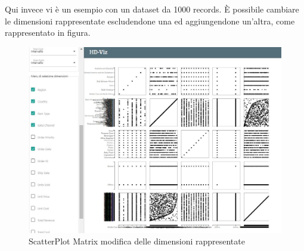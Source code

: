 \documentclass[../manuale_utente.tex]{subfiles}
\begin{document}
Qui invece vi è un esempio con un dataset da 1000 records. È possibile cambiare le dimensioni rappresentate escludendone una ed aggiungendone un'altra, come rappresentato in figura.

\begin{figure}[H]
	\centering
	\includegraphics[width=18cm]{img/spm/spm_cambio_dim.jpg}
	\caption{ScatterPlot Matrix modifica delle dimensioni rappresentate}
\end{figure}
\end{document}

